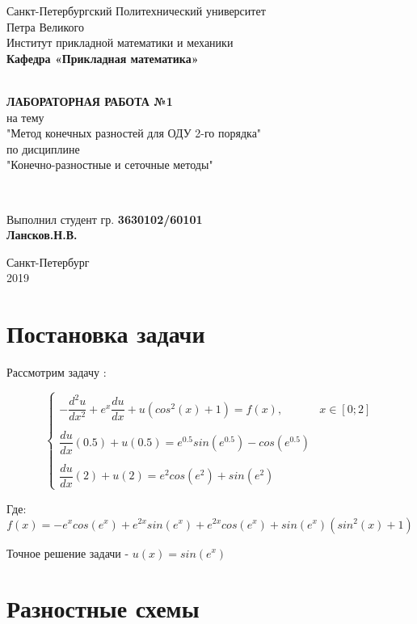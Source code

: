 \documentclass[12pt]{article}
\renewcommand{\listoffigures}{\begingroup  %
\tocsection
\tocfile{\listfigurename}{lof}
\endgroup}
\renewcommand{\listoftables}{\begingroup  %
\tocsection
\tocfile{\listtablename}{lot}
\endgroup}
\begin{document}
\begin{titlepage}
	\center
		Санкт-Петербургский Политехнический 
		университет \\ Петра Великого\\
		Институт прикладной математики и механики
		\\ \textbf{Кафедра «Прикладная математика»}

	\vfill ~
	\textbf{
		\\ \large ЛАБОРАТОРНАЯ РАБОТА №1
	}
	\\	на тему 
	\\ "Метод конечных разностей для ОДУ 2-го порядка"
	\\ по дисциплине
	\\ "Конечно-разностные и сеточные методы"

	\vfill ~

	Выполнил студент гр. \textbf{3630102/60101} \\
	\textbf{Лансков.Н.В.} \\ 

\vfill

{\large}	Санкт-Петербург
\\ 2019
\end{titlepage}


\tableofcontents 
\newpage
\listoffigures
\newpage
\listoftables
\newpage

\section{Постановка задачи}

Рассмотрим задачу :

$$
\begin{cases}
-\dfrac{d^2u}{dx^2} + e^x\dfrac{du}{dx} + u(cos^2(x) + 1) = f(x), & x \in [0;2] \\ \\
\dfrac{du}{dx}(0.5) + u(0.5) = e^{0.5}sin(e^{0.5}) - cos(e^{0.5}) \\ \\
\dfrac{du}{dx}(2) + u(2) = e^2cos(e^2) + sin(e^2)
\end{cases}
$$

Где:
$$
f(x) = -e^xcos(e^x) + e^{2x}sin(e^x) + e^{2x}cos(e^x) + sin(e^x)(sin^2(x) + 1)
$$

Точное решение задачи - $u(x) = sin(e^x)$ 
\section{Разностные схемы}
\end{document}
